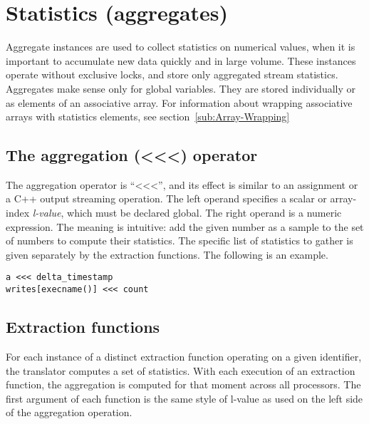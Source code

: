 \documentclass[twoside,english]{article}
\newenvironment{vindent}
{\begin{list}{}{\setlength{\listparindent}{6pt}}
\item[]}
{\end{list}}
\begin{document}
\section{Statistics (aggregates)\label{sec:Statistics}}
Aggregate instances are used to collect statistics on numerical values, when
it is important to accumulate new data quickly and in large volume. These
instances operate without exclusive locks, and store only aggregated stream
statistics. Aggregates make sense only for global variables. They are stored
individually or as elements of an associative array. For information about 
wrapping associative arrays with statistics elements, see section~\ref{sub:Array-Wrapping}



\subsection{The aggregation (\textless\hspace{1 sp}\textless\hspace{1 sp}\textless) operator}
\index{\textless\hspace{1 sp}\textless\hspace{1 sp}\textless}
The aggregation operator is {}``\textless\hspace{1 sp}\textless\hspace{1 sp}\textless'',
and its effect is similar to an assignment or a C++ output streaming operation.
The left operand specifies a scalar or array-index \emph{l-value}, which
must be declared global. The right operand is a numeric expression. The meaning
is intuitive: add the given number as a sample to the set of numbers to compute their
statistics. The specific list of statistics to gather is given separately
by the extraction functions. The following is an example.

\begin{vindent}
\begin{verbatim}
a <<< delta_timestamp
writes[execname()] <<< count
\end{verbatim}
\end{vindent}

\subsection{Extraction functions}
For each instance of a distinct extraction function operating on a given
identifier, the translator computes a set of statistics. With each execution
of an extraction function, the aggregation is computed for that moment across
all processors. The first argument of each function is the same style of
l-value as used on the left side of the aggregation operation.
\end{document}
